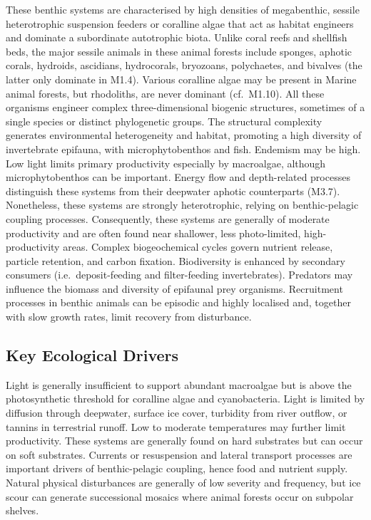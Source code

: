 \documentclass[
  letterpaper,
  DIV=11,
  numbers=noendperiod]{scrartcl}
\begin{document}
These benthic systems are characterised by high densities of
megabenthic, sessile heterotrophic suspension feeders or coralline algae
that act as habitat engineers and dominate a subordinate autotrophic
biota. Unlike coral reefs and shellfish beds, the major sessile animals
in these animal forests include sponges, aphotic corals, hydroids,
ascidians, hydrocorals, bryozoans, polychaetes, and bivalves (the latter
only dominate in M1.4). Various coralline algae may be present in Marine
animal forests, but rhodoliths, are never dominant (cf.~M1.10). All
these organisms engineer complex three-dimensional biogenic structures,
sometimes of a single species or distinct phylogenetic groups. The
structural complexity generates environmental heterogeneity and habitat,
promoting a high diversity of invertebrate epifauna, with
microphytobenthos and fish. Endemism may be high. Low light limits
primary productivity especially by macroalgae, although
microphytobenthos can be important. Energy flow and depth-related
processes distinguish these systems from their deepwater aphotic
counterparts (M3.7). Nonetheless, these systems are strongly
heterotrophic, relying on benthic-pelagic coupling processes.
Consequently, these systems are generally of moderate productivity and
are often found near shallower, less photo-limited, high-productivity
areas. Complex biogeochemical cycles govern nutrient release, particle
retention, and carbon fixation. Biodiversity is enhanced by secondary
consumers (i.e.~deposit-feeding and filter-feeding invertebrates).
Predators may influence the biomass and diversity of epifaunal prey
organisms. Recruitment processes in benthic animals can be episodic and
highly localised and, together with slow growth rates, limit recovery
from disturbance.

\subsection{Key Ecological Drivers}\label{key-ecological-drivers-30}

Light is generally insufficient to support abundant macroalgae but is
above the photosynthetic threshold for coralline algae and
cyanobacteria. Light is limited by diffusion through deepwater, surface
ice cover, turbidity from river outflow, or tannins in terrestrial
runoff. Low to moderate temperatures may further limit productivity.
These systems are generally found on hard substrates but can occur on
soft substrates. Currents or resuspension and lateral transport
processes are important drivers of benthic-pelagic coupling, hence food
and nutrient supply. Natural physical disturbances are generally of low
severity and frequency, but ice scour can generate successional mosaics
where animal forests occur on subpolar shelves.
\end{document}
